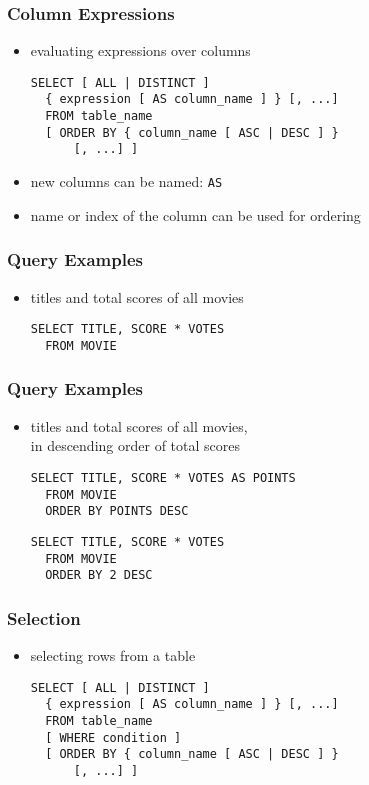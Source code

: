 \documentclass[dvipsnames]{beamer}
\theoremstyle{plain}
\begin{document}
\begin{frame}[fragile]
  \frametitle{Column Expressions}

  \begin{itemize}
    \item evaluating expressions over columns
    \begin{lstlisting}
SELECT [ ALL | DISTINCT ]
  { expression [ AS column_name ] } [, ...]
  FROM table_name
  [ ORDER BY { column_name [ ASC | DESC ] }
      [, ...] ]
    \end{lstlisting}

    \medskip
    \item new columns can be named: \lstinline!AS!
    \item name or index of the column can be used for ordering
  \end{itemize}
\end{frame}

\begin{frame}[fragile]
  \frametitle{Query Examples}

  \begin{itemize}
    \item titles and total scores of all movies
    \begin{lstlisting}
SELECT TITLE, SCORE * VOTES
  FROM MOVIE
    \end{lstlisting}
  \end{itemize}
\end{frame}

\begin{frame}[fragile]
  \frametitle{Query Examples}

  \begin{itemize}
    \item titles and total scores of all movies,\\
      in descending order of total scores
    \begin{lstlisting}
SELECT TITLE, SCORE * VOTES AS POINTS
  FROM MOVIE
  ORDER BY POINTS DESC
    \end{lstlisting}

    \pause
    \begin{lstlisting}
SELECT TITLE, SCORE * VOTES
  FROM MOVIE
  ORDER BY 2 DESC
    \end{lstlisting}
  \end{itemize}
\end{frame}

\begin{frame}[fragile]
  \frametitle{Selection}

  \begin{itemize}
    \item selecting rows from a table
    \begin{lstlisting}
SELECT [ ALL | DISTINCT ]
  { expression [ AS column_name ] } [, ...]
  FROM table_name
  [ WHERE condition ]
  [ ORDER BY { column_name [ ASC | DESC ] }
      [, ...] ]
    \end{lstlisting}
  \end{itemize}
\end{frame}
\end{document}
